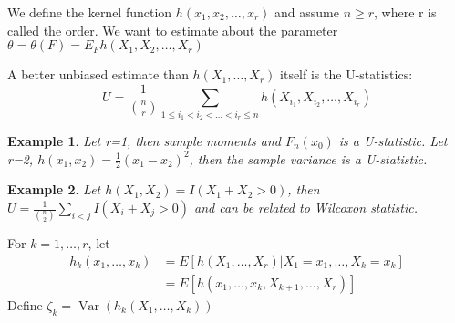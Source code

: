 \documentclass{ctexart}
\newtheorem{example}{Example}[subsection]
\begin{document}
We define the kernel function \(h(x_{1},x_{2},\ldots,x_{r})\) and assume \(n\ge r\), where r is called the order. 
We want to estimate about the parameter \(\theta=\theta(F)=E_{F}h(X_{1},X_{2},\ldots,X_{r})\)  

A better unbiased estimate than \(h(X_{1},\ldots,X_{r})\) itself is the U-statistics: 
\[
U=\frac{1}{{n\choose r}}\sum_{1\le i_{1}<i_{2}<\ldots<i_{r}\le n}^{} h(X_{i_{1}},X_{i_{2}},\ldots,X_{i_{r}})
\]  
\begin{example}
  Let r=1, then sample moments and \(F_{n}(x_{0})\) is a U-statistic. Let r=2, \(h(x_{1},x_{2})=\frac{1}{2}(x_{1}-x_{2})^{2}\), then the sample variance is a U-statistic. 
\end{example}
\begin{example}
  Let \(h(X_{1},X_{2})=I(X_{1}+X_{2}>0)\), then \(U=\frac{1}{{n\choose 2}}\sum_{i<j }^{} I(X_{i }+X_{j }>0)\) and can be related to Wilcoxon statistic.   
\end{example}

For \(k=1,\ldots,r\), let
\begin{align*}
  h_{k}(x_{1},\ldots,x_{k})&=E[h(X_{1},\ldots,X_{r})|X_{1}=x_{1},\ldots,X_{k}=x_{k}]\\
  &=E[h(x_{1},\ldots,x_{k},X_{k+1},\ldots,X_{r})]
\end{align*}
Define \(\zeta_{k}=\operatorname{Var}(h_{k}(X_{1},\ldots,X_{k}))\) 
\end{document}
